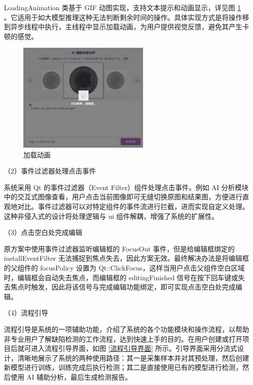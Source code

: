 \documentclass[
  ]{njuthesis}
\begin{document}
LoadingAnimation 类基于 GIF 动图实现，支持文本提示和动画显示，详见图 \ref{加载动画} 。它适用于如大模型推理这种无法判断剩余时间的操作。具体实现方式是将操作移到异步线程中执行，主线程中显示加载动画，为用户提供视觉反馈，避免其产生卡顿的感觉。

\begin{figure}[htb]
    \centering
    \includegraphics[width=0.58\textwidth]{images/加载动画.png}
    \caption{加载动画}
    \label{加载动画}
\end{figure}

（2）事件过滤器处理点击事件

系统采用 Qt 的事件过滤器（Event Filter）组件处理点击事件。例如 AI 分析模块中的交互式图像查看，用户点击当前图像即可无缝切换原图和结果图，方便进行直观地对比。事件过滤器可以对特定组件的事件流进行拦截，进而实现自定义处理。这种非侵入式的设计将处理逻辑与 ui 组件解耦，增强了系统的扩展性。

（3）点击空白处完成编辑

原方案中使用事件过滤器监听编辑框的 FocusOut 事件，但是给编辑框绑定的 installEventFilter 无法捕捉到焦点失去，因此方案无效。最终解决办法是将编辑框的父组件的 focusPolicy 设置为 Qt::ClickFocus，这样当用户点击父组件空白区域时，编辑框会自动失去焦点，而编辑框的 editingFinished 信号在按下回车键或失去焦点时触发，因此将该信号与完成编辑功能绑定，即可实现点击空白处完成编辑。

（4）流程引导

流程引导是系统的一项辅助功能，介绍了系统的各个功能模块和操作流程，以帮助非专业用户了解缺陷检测的工作流程，达到快速上手的目的。在用户创建或打开项目后就可进入流程引导界面，如图 \ref{流程引导界面} 所示。引导界面采用分流式设计，清晰地展示了系统的两种使用路径：其一是采集样本并对其预处理，然后创建新模型进行训练，训练完成后执行检测；其二是直接使用已有的模型进行检测，然后使用 AI 辅助分析，最后生成检测报告。
\end{document}
